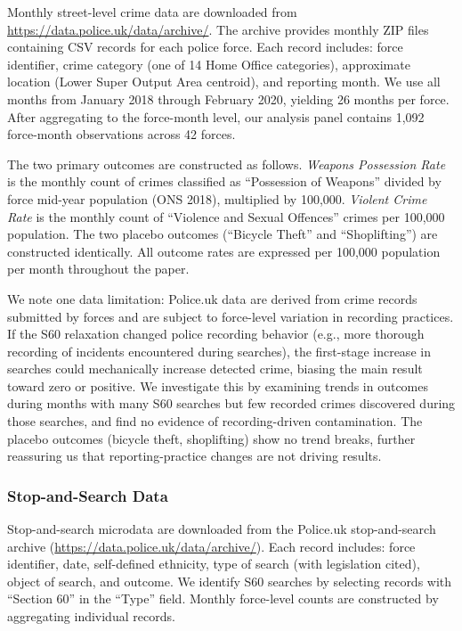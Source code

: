 \documentclass[12pt]{article}
\begin{document}
Monthly street-level crime data are downloaded from \url{https://data.police.uk/data/archive/}. The archive provides monthly ZIP files containing CSV records for each police force. Each record includes: force identifier, crime category (one of 14 Home Office categories), approximate location (Lower Super Output Area centroid), and reporting month. We use all months from January 2018 through February 2020, yielding 26 months per force. After aggregating to the force-month level, our analysis panel contains 1,092 force-month observations across 42 forces.

The two primary outcomes are constructed as follows. \textit{Weapons Possession Rate} is the monthly count of crimes classified as ``Possession of Weapons'' divided by force mid-year population (ONS 2018), multiplied by 100,000. \textit{Violent Crime Rate} is the monthly count of ``Violence and Sexual Offences'' crimes per 100,000 population. The two placebo outcomes (``Bicycle Theft'' and ``Shoplifting'') are constructed identically. All outcome rates are expressed per 100,000 population per month throughout the paper.

We note one data limitation: Police.uk data are derived from crime records submitted by forces and are subject to force-level variation in recording practices. If the S60 relaxation changed police recording behavior (e.g., more thorough recording of incidents encountered during searches), the first-stage increase in searches could mechanically increase detected crime, biasing the main result toward zero or positive. We investigate this by examining trends in outcomes during months with many S60 searches but few recorded crimes discovered during those searches, and find no evidence of recording-driven contamination. The placebo outcomes (bicycle theft, shoplifting) show no trend breaks, further reassuring us that reporting-practice changes are not driving results.

\subsubsection*{Stop-and-Search Data}

Stop-and-search microdata are downloaded from the Police.uk stop-and-search archive (\url{https://data.police.uk/data/archive/}). Each record includes: force identifier, date, self-defined ethnicity, type of search (with legislation cited), object of search, and outcome. We identify S60 searches by selecting records with ``Section 60'' in the ``Type'' field. Monthly force-level counts are constructed by aggregating individual records.
\end{document}
